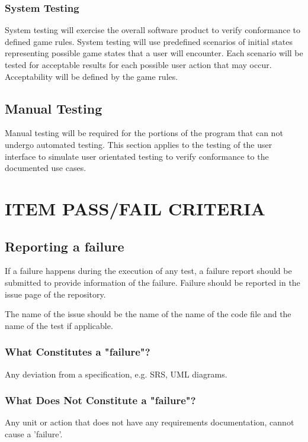 \documentclass[report]{article}
\begin{document}
\subsubsection{System Testing}
System testing will exercise the overall software product to verify conformance to defined game rules. System testing will use predefined scenarios of initial states representing possible game states that a user will encounter. Each scenario will be tested for acceptable results for each possible user action that may occur. Acceptability will be defined by the game rules. 

\subsection{Manual Testing}
Manual testing will be required for the portions of the program that can not undergo automated testing. This section applies to the testing of the user interface to simulate user orientated testing to verify conformance to the documented use cases.


\section[ITEM PASS/FAIL CRITERIA]{ITEM PASS/FAIL CRITERIA}

\subsection{Reporting a failure}

If a failure happens during the execution of any test, a failure report should be submitted to provide information of the failure. Failure should be reported in the issue page of the repository. 

The name of the issue should be the name of the name of the code file and the name of the test if applicable.

\subsubsection{What Constitutes a "failure"?}
Any deviation from a specification, e.g. SRS, UML diagrams.

\subsubsection{What Does Not Constitute a "failure"?}
Any unit or action that does not have any requirements documentation, cannot cause a 'failure'.
\end{document}
